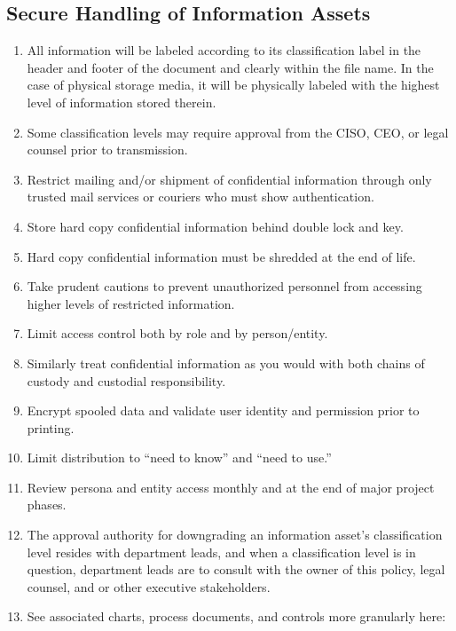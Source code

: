 \documentclass[../main.tex]{subfiles}
\begin{document}
\subsection{Secure Handling of Information Assets}
\begin{enumerate}
    \item All information will be labeled according to its classification label in the header and footer of the document and clearly within the file name. In the case of physical storage media,
    it will be physically labeled with the highest level of information stored therein.
    \item Some classification levels may require approval from the CISO, CEO, or legal counsel prior to transmission.
    \item Restrict mailing and/or shipment of confidential information through only trusted mail services or couriers who must show authentication.
    \item Store hard copy confidential information behind double lock and key.
    \item Hard copy confidential information must be shredded at the end of life.
    \item Take prudent cautions to prevent unauthorized personnel from accessing higher levels of restricted information.
    \item Limit access control both by role and by person/entity.
    \item Similarly treat confidential information as you would with both chains of custody and custodial responsibility.
    \item Encrypt spooled data and validate user identity and permission prior to printing.
    \item Limit distribution to “need to know” and “need to use.”
    \item Review persona and entity access monthly and at the end of major project phases.
    \item The approval authority for downgrading an information asset's classification level resides with department leads, and when a classification level is in question,
    department leads are to consult with the owner of this policy, legal counsel, and or other executive stakeholders.
    \item See associated charts, process documents, and controls more granularly here: \InfoInventory
\end{enumerate}
\end{document}
